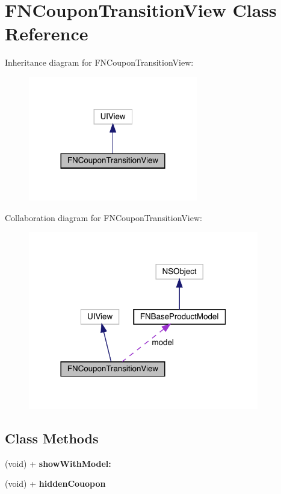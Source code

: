 \hypertarget{interface_f_n_coupon_transition_view}{}\section{F\+N\+Coupon\+Transition\+View Class Reference}
\label{interface_f_n_coupon_transition_view}


Inheritance diagram for F\+N\+Coupon\+Transition\+View\+:\nopagebreak
\begin{figure}[H]
\begin{center}
\leavevmode
\includegraphics[width=209pt]{interface_f_n_coupon_transition_view__inherit__graph}
\end{center}
\end{figure}


Collaboration diagram for F\+N\+Coupon\+Transition\+View\+:\nopagebreak
\begin{figure}[H]
\begin{center}
\leavevmode
\includegraphics[width=285pt]{interface_f_n_coupon_transition_view__coll__graph}
\end{center}
\end{figure}
\subsection*{Class Methods}
\begin{DoxyCompactItemize}
\item 
\mbox{\label{interface_f_n_coupon_transition_view_ab63d5ffc220cc5e2c68a4b2a0fdfd0fd}} 
(void) + {\bfseries show\+With\+Model\+:}
\item 
\mbox{\label{interface_f_n_coupon_transition_view_adfeeaa3285693599b3d9b3afa81524ca}} 
(void) + {\bfseries hidden\+Couopon}
\end{DoxyCompactItemize}
